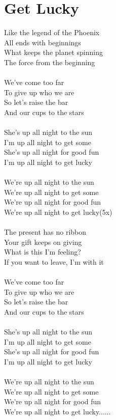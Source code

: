 \section{Get Lucky}
Like the legend of the Phoenix\\
All ends with beginnings\\
What keeps the planet spinning\\
The force from the beginning\\
\\
We've come too far\\
To give up who we are\\
So let's raise the bar\\
And our cups to the stars\\
\\
She's up all night to the sun\\
I'm up all night to get some\\
She's up all night for good fun\\
I'm up all night to get lucky\\
\\
We're up all night to the sun\\
We're up all night to get some\\
We're up all night for good fun\\
We're up all night to get lucky(5x)\\
\\
The present has no ribbon\\
Your gift keeps on giving\\
What is this I'm feeling?\\
If you want to leave, I'm with it\\
\\
We've come too far \\
To give up who we are\\
So let's raise the bar\\
And our cups to the stars\\
\\
She's up all night to the sun\\
I'm up all night to get some\\
She's up all night for good fun\\
I'm up all night to get lucky\\
\\
We're up all night to the sun\\
We're up all night to get some\\
We're up all night for good fun\\
We’re up all night to get lucky......\\